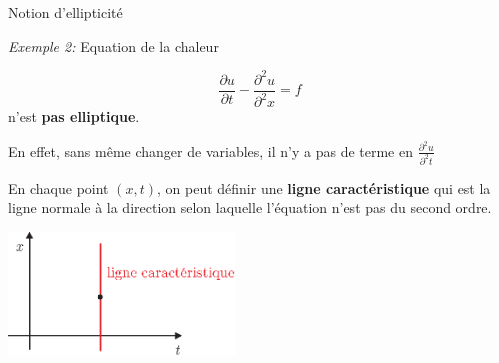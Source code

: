\documentclass[
mode=present,    %
paper=a4paper,   %
orient=landscape,
display=slides,   %
size=10pt,
style=romain   %
]{powerdot}
\begin{document}
\begin{slide}[toc=Equ. chaleur]{Notion d'ellipticité}

\emph{Exemple 2:} Equation de la chaleur

\begin{equation*}
\frac{\partial u}{\partial t} - \frac{\partial^2 u}{\partial^2 x} =  f
\end{equation*}
n'est \textbf{pas elliptique}.

\bigskip

En effet, sans même changer de variables, il n'y a pas de terme en $\displaystyle\frac{\partial^2 u}{\partial^2 t}$

\bigskip
En chaque point $(x,t)$, on peut définir une \textbf{ligne caractéristique} qui est la ligne normale à la direction selon laquelle l'équation n'est pas du second ordre.

    \centerline{\includegraphics[width=0.45\textwidth]{parabolic.eps} }

\end{slide}
\end{document}
